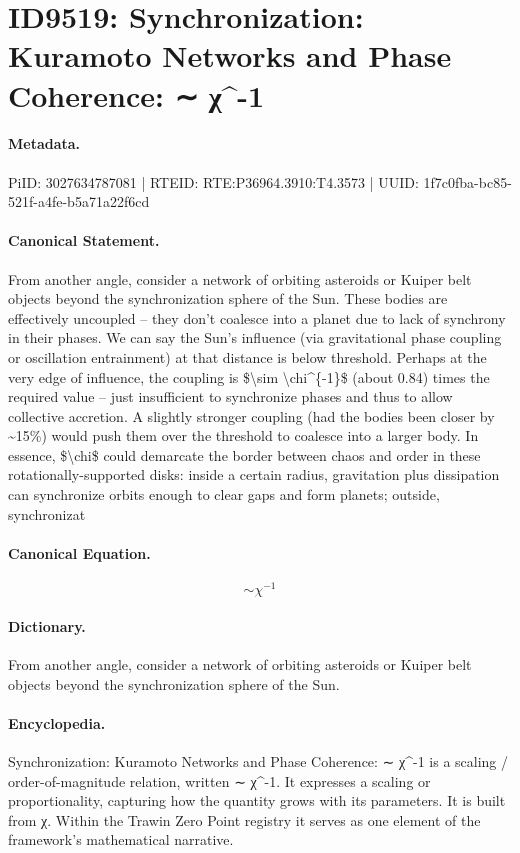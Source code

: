 \section*{ID9519: Synchronization: Kuramoto Networks and Phase Coherence: ∼ χ\textasciicircum{}-1}
\paragraph{Metadata.}
PiID: 3027634787081 | RTEID: RTE:P36964.3910:T4.3573 | UUID: 1f7c0fba-bc85-521f-a4fe-b5a71a22f6cd

\paragraph{Canonical Statement.}
From another angle, consider a network of orbiting asteroids or Kuiper belt objects beyond the synchronization sphere of the Sun. These bodies are effectively uncoupled – they don’t coalesce into a planet due to lack of synchrony in their phases. We can say the Sun’s influence (via gravitational phase coupling or oscillation entrainment) at that distance is below threshold. Perhaps at the very edge of influence, the coupling is \$\textbackslash{}sim \textbackslash{}chi\textasciicircum{}\{-1\}\$ (about 0.84) times the required value – just insufficient to synchronize phases and thus to allow collective accretion. A slightly stronger coupling (had the bodies been closer by \textasciitilde{}15\%) would push them over the threshold to coalesce into a larger body. In essence, \$\textbackslash{}chi\$ could demarcate the border between chaos and order in these rotationally-supported disks: inside a certain radius, gravitation plus dissipation can synchronize orbits enough to clear gaps and form planets; outside, synchronizat

\paragraph{Canonical Equation.}
\[
\sim \chi^{-1}
\]

\paragraph{Dictionary.}
From another angle, consider a network of orbiting asteroids or Kuiper belt objects beyond the synchronization sphere of the Sun.

\paragraph{Encyclopedia.}
Synchronization: Kuramoto Networks and Phase Coherence: ∼ χ\textasciicircum{}-1 is a scaling / order-of-magnitude relation, written ∼ χ\textasciicircum{}-1. It expresses a scaling or proportionality, capturing how the quantity grows with its parameters. It is built from χ. Within the Trawin Zero Point registry it serves as one element of the framework's mathematical narrative.
